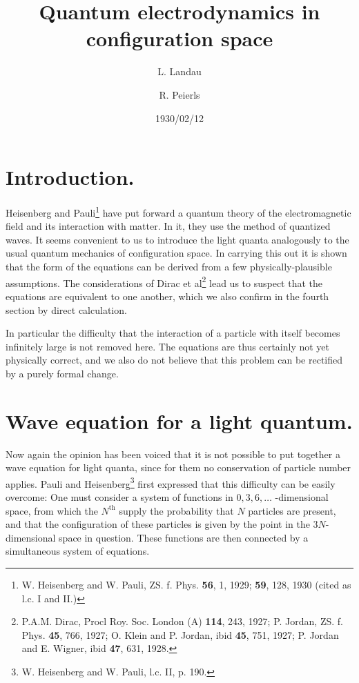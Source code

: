 \documentclass[a4paper,11pt]{article}
\newcommand{\?}[2]{#1\footnote{\textsc{Translator note}: #2}}
\newcommand{\publication}[1]{%
    \gdef\puB{#1}}
\newcommand{\puB}{}
\newcommand{\location}[1]{%
    \gdef\loB{#1}}
\newcommand{\loB}{}
\begin{document}
\title{Quantum electrodynamics in configuration space}

\author{L. Landau \and R. Peierls}
\location{Zurich}
\publication{Zeitschrift für Physik, volume 62}
\date{1930/02/12}

\maketitle


\section*{Introduction.} Heisenberg and Pauli\footnote{W. Heisenberg and W. Pauli, ZS. f. Phys. \textbf{56}, 1, 1929; \textbf{59}, 128, 1930 (cited as l.c. I and II.)} have put forward a quantum theory of the electromagnetic field and its interaction with matter. In it, they use the method of quantized waves. It seems convenient to us to introduce the light quanta analogously to the usual quantum mechanics of configuration space. In carrying this out it is shown that the form of the equations can be derived from a few physically-plausible assumptions. The considerations of Dirac et al\footnote{P.A.M. Dirac, Procl Roy. Soc. London (A) \textbf{114}, 243, 1927; P. Jordan, ZS. f. Phys. \textbf{45}, 766, 1927; O. Klein and P. Jordan, ibid \textbf{45}, 751, 1927; P. Jordan and E. Wigner, ibid \textbf{47}, 631, 1928.} lead us to suspect that the equations are equivalent to one another, which we also confirm in the fourth section by direct calculation.

In particular the difficulty that the interaction of a particle with itself becomes infinitely large is not removed here. The equations are thus certainly not yet physically correct, and we also do not believe that this problem can be rectified by a purely formal change. 

\section{Wave equation for a light quantum.} Now again the opinion has been voiced that it is not possible to put together a wave equation for light quanta, since for them no conservation of particle number applies. Pauli and Heisenberg\footnote{W. Heisenberg and W. Pauli, l.c. II, p. 190.} first expressed that this difficulty can be easily overcome: One must consider a system of functions in $0,3,6,\dots$ -dimensional space, from which the $N^\text{th}$ supply the probability that $N$ particles are present, and that the configuration of these particles is given by the point in the $3N$-dimensional space in question. These functions are then connected by a simultaneous system of equations.
\end{document}
